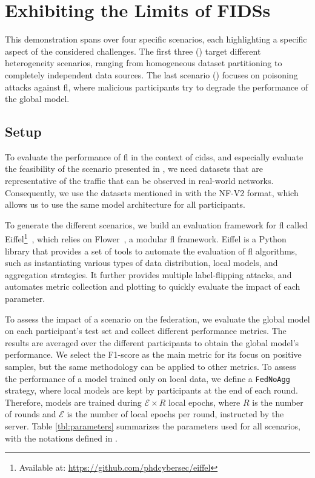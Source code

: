 \section{Exhibiting the Limits of FIDSs\label{sec:app.demo}}

This demonstration spans over four specific scenarios, each highlighting a specific aspect of the considered challenges.
The first three () target different heterogeneity scenarios, ranging from homogeneous dataset partitioning to completely independent data sources.
The last scenario () focuses on poisoning attacks against \gls{fl}, where malicious participants try to degrade the performance of the global model.


\subsection{Setup\label{sec:app.demo.setup}}

To evaluate the performance of \gls{fl} in the context of \glspl{cids}, and especially evaluate the feasibility of the scenario presented in , we need datasets that are representative of the traffic that can be observed in real-world networks.
Consequently, we use the datasets mentioned in  with the NF-V2 format, which allows us to use the same model architecture for all participants.

To generate the different scenarios, we build an evaluation framework for \gls{fl} called Eiffel\footnote{Available at: \url{https://github.com/phdcybersec/eiffel}}~\cite{lavaur_icdcs_demo_2024}, which relies on Flower~\cite{beutel_Flowerfriendlyfederated_2020}, a modular \gls{fl} framework. 
Eiffel is a Python library that provides a set of tools to automate the evaluation of \gls{fl} algorithms, such as instantiating various types of data distribution, local models, and aggregation strategies.
It further provides multiple label-flipping attacks, and automates metric collection and plotting to quickly evaluate the impact of each parameter.

To assess the impact of a scenario on the federation, we evaluate the global model on each participant's test set and collect different performance metrics.
The results are averaged over the different participants to obtain the global model's performance.
We select the F1-score as the main metric for its focus on positive samples, but the same methodology can be applied to other metrics.
To assess the performance of a model trained only on local data, we define a \texttt{FedNoAgg} strategy, where local models are kept by participants at the end of each round. 
Therefore, models are trained during $\mathcal{E} \times R$ local epochs, where $R$ is the number of rounds and $\mathcal{E}$ is the number of local epochs per round, instructed by the server.
Table \ref{tbl:parameters} summarizes the parameters used for all scenarios, with the notations defined in .


